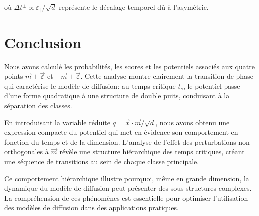 \documentclass[11pt,a4paper]{article}
\begin{document}
où $\Delta t^{\pm} \propto \varepsilon_{\parallel}/\sqrt{d}$ représente le décalage temporel dû à l'asymétrie.

\section{Conclusion}

Nous avons calculé les probabilités, les scores et les potentiels associés aux quatre points $\vec{m} \pm \vec{\varepsilon}$ et $-\vec{m} \pm \vec{\varepsilon}$. Cette analyse montre clairement la transition de phase qui caractérise le modèle de diffusion: au temps critique $t_s$, le potentiel passe d'une forme quadratique à une structure de double puits, conduisant à la séparation des classes.

En introduisant la variable réduite $q = \vec{x} \cdot \vec{m} / \sqrt{d}$, nous avons obtenu une expression compacte du potentiel qui met en évidence son comportement en fonction du temps et de la dimension. L'analyse de l'effet des perturbations non orthogonales à $\vec{m}$ révèle une structure hiérarchique des temps critiques, créant une séquence de transitions au sein de chaque classe principale.

Ce comportement hiérarchique illustre pourquoi, même en grande dimension, la dynamique du modèle de diffusion peut présenter des sous-structures complexes. La compréhension de ces phénomènes est essentielle pour optimiser l'utilisation des modèles de diffusion dans des applications pratiques.
\end{document}
